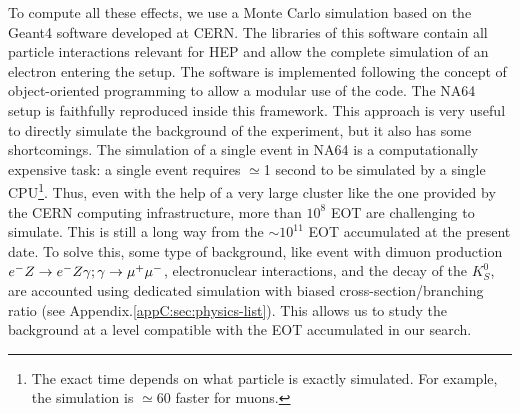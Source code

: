 To compute all these effects, we use a Monte Carlo simulation based on the Geant4 software \cite{AGOSTINELLI2003250,1610988} developed at CERN. The libraries of this software contain all particle interactions relevant for HEP and allow the complete simulation of an electron entering the setup. The software is implemented following the concept of object-oriented programming to allow a modular use of the code. The NA64 setup is faithfully reproduced inside this framework. This approach is very useful to directly simulate the background of the experiment, but it also has some shortcomings. The simulation of a single event in NA64 is a computationally expensive task: a single event requires $\simeq$1 second to be simulated by a single CPU\footnote{The exact time depends on what particle is exactly simulated. For example, the simulation is $\simeq$60 faster for muons.}. Thus, even with the help of a very large cluster like the one provided by the CERN computing infrastructure, more than $10^8$ EOT are challenging to simulate. This is still a long way from the $\sim 10^{11}$ EOT accumulated at the present date. To solve this, some type of background, like event with dimuon production $e^- Z \to e^- Z \gamma; \gamma \to \mu^+ \mu^-$, electronuclear interactions, and the decay of the $K^0_S$, are accounted using dedicated simulation with biased cross-section/branching ratio (see Appendix.\ref{appC:sec:physics-list}). This allows us to study the background at a level compatible with the EOT accumulated in our search.

